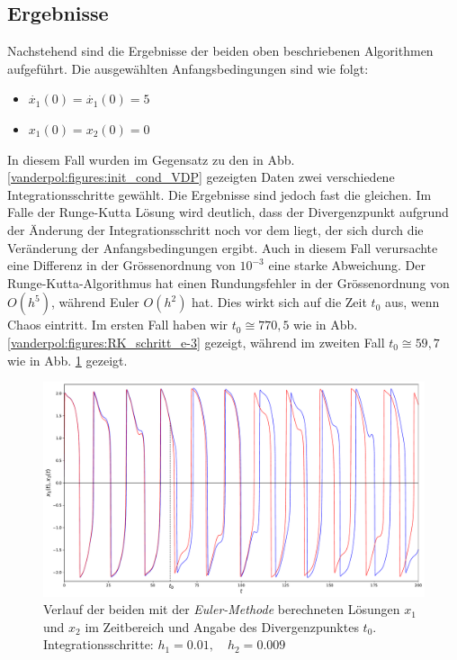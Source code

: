 \subsection{Ergebnisse
\label{vanderpol:section:ergebnisse}}
Nachstehend sind die Ergebnisse der beiden oben beschriebenen Algorithmen aufgeführt. Die ausgewählten Anfangsbedingungen sind wie folgt:

\begin{itemize}
\item
$\dot{x_1}(0) = \dot{x_1}(0) = 5$
\item
$x_1(0) = x_2(0) = 0$
\end{itemize}
In diesem Fall wurden im Gegensatz zu den in Abb.\ref{vanderpol:figures:init_cond_VDP} gezeigten Daten zwei verschiedene Integrationsschritte gewählt. Die Ergebnisse sind jedoch fast die gleichen. Im Falle der Runge-Kutta Lösung wird deutlich, dass der Divergenzpunkt aufgrund der Änderung der Integrationsschritt noch vor dem liegt, der sich durch die Veränderung der Anfangsbedingungen ergibt. Auch in diesem Fall verursachte eine Differenz in der Grössenordnung von $10^{-3}$ eine starke Abweichung. Der Runge-Kutta-Algorithmus hat einen Rundungsfehler in der Grössenordnung von $O(h^5)$, während Euler $O(h^2)$ hat. Dies wirkt sich auf die Zeit $t_0$ aus, wenn Chaos eintritt. Im ersten Fall haben wir $t_0 \cong 770,5$ wie in Abb. \ref{vanderpol:figures:RK_schritt_e-3} gezeigt, während im zweiten Fall $t_0 \cong 59,7$ wie in Abb. \ref{vanderpol:figures:EULER_schritt} gezeigt.  

\begin{figure}
\includegraphics[width=\textwidth]{papers/vanderpol/figures/EULER_schritt_delta_e-3.pdf}
\caption{Verlauf der beiden mit der {\em Euler-Methode} berechneten Lösungen $x_1$ und $x_2$ im Zeitbereich und Angabe des Divergenzpunktes $t_0$. Integrationsschritte: $h_1 = 0.01, \quad h_2 = 0.009$\label{vanderpol:figures:EULER_schritt}}
\end{figure}

